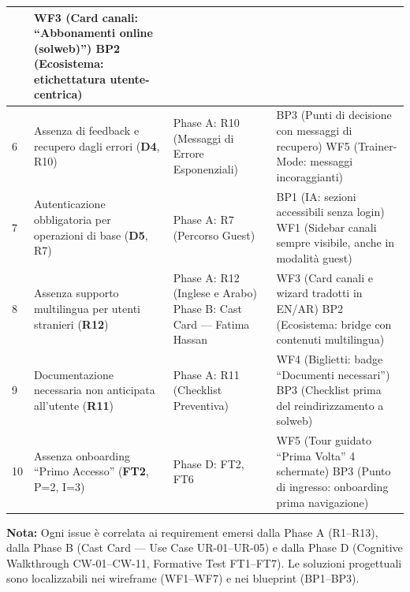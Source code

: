 ﻿\documentclass[11pt,a4paper]{article}
\begin{document}
\begin{longtable}{|p{0.8cm}|p{3.2cm}|p{3.3cm}|p{6.2cm}|}
& WF3 (Card canali: ``Abbonamenti online (solweb)'') \newline BP2 (Ecosistema: etichettatura utente-centrica) \\
\hline
6 & Assenza di feedback e recupero dagli errori (\textbf{D4}, R10) 
& Phase A: R10 (Messaggi di Errore Esponenziali)
& BP3 (Punti di decisione con messaggi di recupero) \newline WF5 (Trainer-Mode: messaggi incoraggianti) \\
\hline
7 & Autenticazione obbligatoria per operazioni di base (\textbf{D5}, R7) 
& Phase A: R7 (Percorso Guest)
& BP1 (IA: sezioni accessibili senza login) \newline WF1 (Sidebar canali sempre visibile, anche in modalit\`a guest) \\
\hline
8 & Assenza supporto multilingua per utenti stranieri (\textbf{R12}) 
& Phase A: R12 (Inglese e Arabo) \newline Phase B: Cast Card --- Fatima Hassan
& WF3 (Card canali e wizard tradotti in EN/AR) \newline BP2 (Ecosistema: bridge con contenuti multilingua) \\
\hline
9 & Documentazione necessaria non anticipata all'utente (\textbf{R11}) 
& Phase A: R11 (Checklist Preventiva)
& WF4 (Biglietti: badge ``Documenti necessari'') \newline BP3 (Checklist prima del reindirizzamento a solweb) \\
\hline
10 & Assenza onboarding ``Primo Accesso'' (\textbf{FT2}, P=2, I=3) 
& Phase D: FT2, FT6
& WF5 (Tour guidato ``Prima Volta'' 4 schermate) \newline BP3 (Punto di ingresso: onboarding prima navigazione) \\
\hline
\end{longtable}

\vspace{0.3cm}

\begin{tcolorbox}[summarybox]
\small
\textbf{Nota:} Ogni issue \`e correlata ai requirement emersi dalla Phase A (R1--R13), dalla Phase B (Cast Card --- Use Case UR-01--UR-05) e dalla Phase D (Cognitive Walkthrough CW-01--CW-11, Formative Test FT1--FT7). Le soluzioni progettuali sono localizzabili nei wireframe (WF1--WF7) e nei blueprint (BP1--BP3).
\end{tcolorbox}

\end{document}
